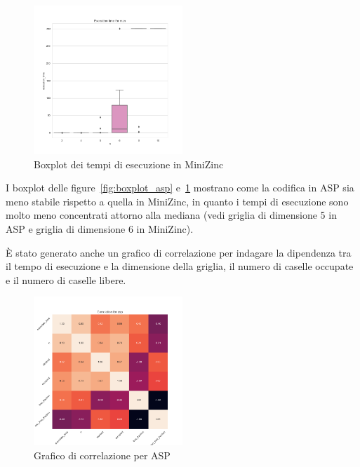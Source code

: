 \begin{figure}
    \centering
    \includegraphics[width=0.5\textwidth]{img/boxplot_mzn}
    \caption{Boxplot dei tempi di esecuzione in MiniZinc}
    \label{fig:boxplot_mzn}
\end{figure}

I boxplot delle figure~\ref{fig:boxplot_asp} e~\ref{fig:boxplot_mzn} mostrano come la codifica in ASP sia meno stabile rispetto a quella in MiniZinc, in quanto i tempi di esecuzione sono molto meno concentrati attorno alla mediana (vedi griglia di dimensione 5 in ASP e griglia di dimensione 6 in MiniZinc).

È stato generato anche un grafico di correlazione per indagare la dipendenza tra il tempo di esecuzione e la dimensione della griglia, il numero di caselle occupate e il numero di caselle libere.

\begin{figure}
    \centering
    \includegraphics[width=0.5\textwidth]{img/correlation_asp}
    \caption{Grafico di correlazione per ASP}
    \label{fig:correlation_asp}
\end{figure}

